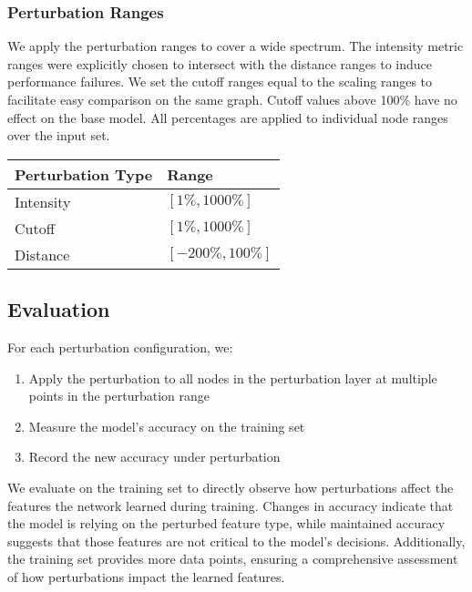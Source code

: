 \subsubsection{Perturbation Ranges}

We apply the perturbation ranges to cover a wide spectrum. The intensity metric ranges were explicitly chosen to intersect with the distance ranges to induce performance failures. We set the cutoff ranges equal to the scaling ranges to facilitate easy comparison on the same graph. Cutoff values above 100\% have no effect on the base model. All percentages are applied to individual node ranges over the input set.

\begin{table}[h]
\centering
\begin{tabular}{ll}
\hline
\textbf{Perturbation Type} & \textbf{Range} \\
\hline
Intensity & $[1\%, 1000\%]$  \\
Cutoff & $[1\%, 1000\%]$  \\
Distance & $[-200\%, 100\%]$  \\
\hline
\end{tabular}
\end{table}

\subsection{Evaluation}
For each perturbation configuration, we:
\begin{enumerate}
    \item Apply the perturbation to all nodes in the perturbation layer at multiple points in the perturbation range
    \item Measure the model's accuracy on the training set
    \item Record the new accuracy under perturbation
\end{enumerate}

We evaluate on the training set to directly observe how perturbations affect the features the network learned during training. Changes in accuracy indicate that the model is relying on the perturbed feature type, while maintained accuracy suggests that those features are not critical to the model's decisions. Additionally, the training set provides more data points, ensuring a comprehensive assessment of how perturbations impact the learned features.